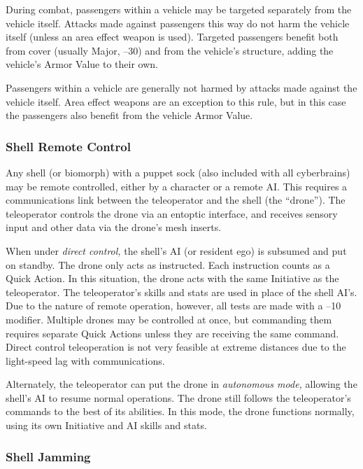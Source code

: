 During combat, passengers within a vehicle may be 
targeted separately from the vehicle itself. Attacks 
made against passengers this way do not harm the 
vehicle itself (unless an area effect weapon is used). 
Targeted passengers benefit both from cover (usually 
Major, –30) and from the vehicle's structure, adding 
the vehicle's Armor Value to their own.

Passengers within a vehicle are generally not harmed 
by attacks made against the vehicle itself. Area effect 
weapons are an exception to this rule, but in this case 
the passengers also benefit from the vehicle Armor Value.

\subsubsection{Shell Remote Control}

Any shell (or biomorph) with a puppet sock (also included
with all cyberbrains) may be remote controlled,
either by a character or a remote AI. This requires a 
communications link between the teleoperator and 
the shell (the ``drone''). The teleoperator controls the 
drone via an entoptic interface, and receives sensory 
input and other data via the drone's mesh inserts.

When under \textit{direct control,} the shell's AI (or resident 
ego) is subsumed and put on standby. The drone only 
acts as instructed. Each instruction counts as a Quick 
Action. In this situation, the drone acts with the same 
Initiative as the teleoperator. The teleoperator's skills and 
stats are used in place of the shell AI's. Due to the nature 
of remote operation, however, all tests are made with a 
–10 modifier. Multiple drones may be controlled at once, 
but commanding them requires separate Quick Actions 
unless they are receiving the same command. Direct 
control teleoperation is not very feasible at extreme distances
due to the light-speed lag with communications.

Alternately, the teleoperator can put the drone in 
\textit{autonomous mode,} allowing the shell's AI to resume 
normal operations. The drone still follows the teleoperator's
commands to the best of its abilities. In this
mode, the drone functions normally, using its own 
Initiative and AI skills and stats.

\subsubsection{Shell Jamming}

